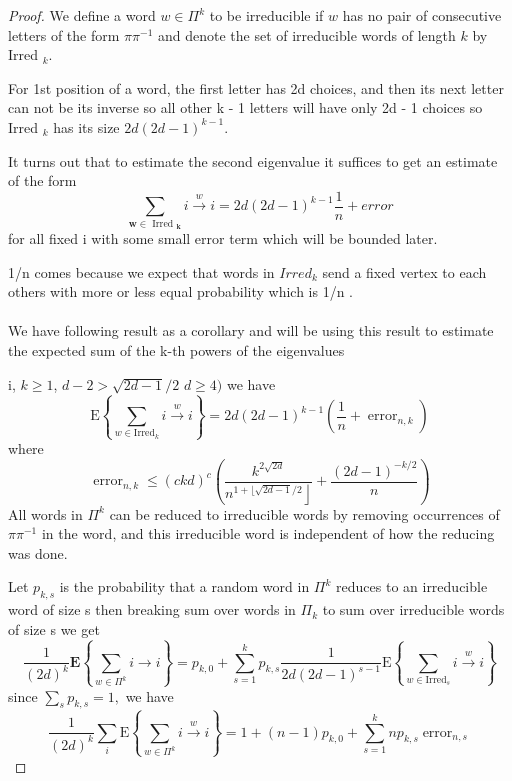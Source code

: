 \documentclass[oneside]{book}
\begin{document}
\begin{proof}
		We define a word $w \in \Pi^{k}$ to be irreducible if $w$ has no pair of consecutive letters of the form $\pi \pi^{-1}$ and denote the set of irreducible words of length $k$ by Irred $_{k} .$\par
		For 1st position of a word, the first letter has  2d choices, and then its next letter can not be its inverse so all other k - 1 letters will have only 2d - 1 choices so
		Irred $_{k}$ has its  size $2 d(2 d-1)^{k-1} .$ \par 
		It turns out that to estimate the second eigenvalue it suffices
		to get an estimate of the form
		$$
		\sum_{\boldsymbol{w} \in \text { Irred }_{\boldsymbol{k}}} i \stackrel{w}{\rightarrow} i=2 d(2 d-1)^{k-1} \frac{1}{n} + error 
		$$
		for all fixed i with some small error term which will be bounded later.\par
		1/n comes because we expect  that words in $Irred_{k} $ send a fixed vertex to each  others with more or less equal probability which is 1/n . \\\\
		We have following result as a corollary and will be using this result to estimate the expected sum of the k-th powers of the eigenvalues \par
		 i, $k \geq 1$,  $d-2>\sqrt{2 d-1} / 2$  $d \geq 4)$ we have
		$$
		\mathrm{E}\left\{\sum_{w \in \mathrm{Irred}_{k}} i \stackrel{w}{\rightarrow} i\right\}=2 d(2 d-1)^{k-1}\left(\frac{1}{n}+\operatorname{error}_{n, k}\right)
		$$
		where
		$$
		\operatorname{error}_{n, k} \leq(c k d)^{c}\left(\frac{k^{2 \sqrt{2 d}}}{\left.n^{1+\lfloor\sqrt{2 d-1} / 2}\right\rfloor}+\frac{(2 d-1)^{-k / 2}}{n}\right)
		$$
		All words in $\Pi^{k}$ can be reduced to irreducible words by removing occurrences of $\pi \pi^{-1}$ in the word, and this irreducible word is independent of how the reducing was done. \par 
		Let  $p_{k,s}$ is the probability that a random word in  $\Pi^{k}$ reduces to an irreducible word of size s then breaking sum over words in  $\Pi_k$ to sum over irreducible words of size s  we get  
		$$
		\frac{1}{(2 d)^{k}} \mathbf{E}\left\{\sum_{w \in \Pi^{k}} i\rightarrow i\right\}=p_{k, 0}+\sum_{s=1}^{k} p_{k, s} \frac{1}{2 d(2 d-1)^{s-1}} \mathrm{E}\left\{\sum_{w \in \mathrm{Irred}_{s}} i \stackrel{w}{\rightarrow} i\right\}
		$$
		since $\sum_{s} p_{k, s}=1,$ we have
		$$ 
		\frac{1}{(2 d)^{k}} \sum_{i} \mathrm{E}\left\{\sum_{w \in \Pi^{k}} i \stackrel{w}{\rightarrow} i\right\}=1+(n-1) p_{k, 0}+\sum_{s=1}^{k} n p_{k, s} \operatorname{error}_{n, s} 
$$
\end{proof}
\end{document}
